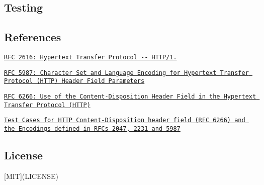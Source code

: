 \subsection*{Testing}




\subsection*{References}


\begin{DoxyItemize}
\item \href{https://tools.ietf.org/html/rfc2616}{\tt R\+F\+C 2616\+: Hypertext Transfer Protocol -\/-\/ H\+T\+T\+P/1.}
\item \href{https://tools.ietf.org/html/rfc5987}{\tt R\+F\+C 5987\+: Character Set and Language Encoding for Hypertext Transfer Protocol (H\+T\+T\+P) Header Field Parameters}
\item \href{https://tools.ietf.org/html/rfc6266}{\tt R\+F\+C 6266\+: Use of the Content-\/\+Disposition Header Field in the Hypertext Transfer Protocol (H\+T\+T\+P)}
\item \href{http://greenbytes.de/tech/tc2231/}{\tt Test Cases for H\+T\+T\+P Content-\/\+Disposition header field (R\+F\+C 6266) and the Encodings defined in R\+F\+Cs 2047, 2231 and 5987}
\end{DoxyItemize}

\subsection*{License}

\mbox{[}M\+I\+T\mbox{]}(L\+I\+C\+E\+N\+S\+E) 